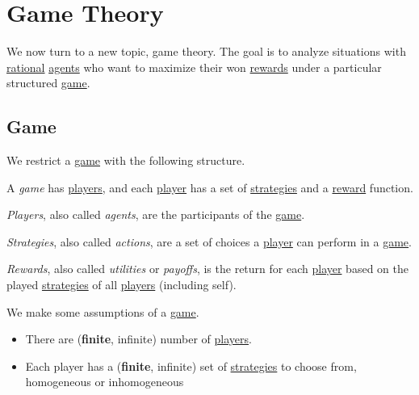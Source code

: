 \chapter{Game Theory}\label{ch:game-theory}
We now turn to a new topic, game theory. The goal is to analyze situations with \hyperref[rationality]{rational} \hyperref[def:player]{agents}
who want to maximize their won \hyperref[def:reward]{rewards} under a particular structured \hyperref[def:game]{game}.

\section{Game}
We restrict a \hyperref[def:game]{game} with the following structure.
\begin{definition}[Game]\label{def:game}
	A \emph{game} has \hyperref[def:player]{players}, and each \hyperref[def:player]{player} has a set of \hyperref[def:strategy]{strategies} and
	a \hyperref[def:reward]{reward} function.

	\begin{definition}[Player]\label{def:player}
		\emph{Players}, also called \emph{agents}, are the participants of the \hyperref[def:game]{game}.
	\end{definition}

	\begin{definition}[Strategy]\label{def:strategy}
		\emph{Strategies}, also called \emph{actions}, are a set of choices a \hyperref[def:player]{player} can perform in a \hyperref[def:game]{game}.
	\end{definition}

	\begin{definition}[Reward]\label{def:reward}
		\emph{Rewards}, also called \emph{utilities} or \emph{payoffs}, is the return for each \hyperref[def:player]{player} based on the played
		\hyperref[def:strategy]{strategies} of all \hyperref[def:player]{players} (including self).
	\end{definition}
\end{definition}
\begin{note}
	We make some assumptions of a \hyperref[def:game]{game}.
	\begin{itemize}
		\item There are (\textbf{finite}, infinite) number of \hyperref[def:player]{players}.
		\item Each player has a (\textbf{finite}, infinite) set of \hyperref[def:strategy]{strategies} to choose from, homogeneous or inhomogeneous
	\end{itemize}
\end{note}

